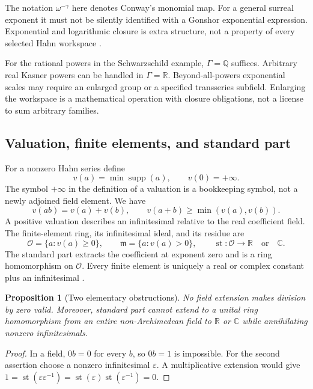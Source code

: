 \documentclass[11pt,a4paper]{article}
\numberwithin{equation}{section}
\newtheorem{proposition}[theorem]{Proposition}
\theoremstyle{definition}
\theoremstyle{remark}
\newcommand{\R}{\mathbb R}
\newcommand{\C}{\mathbb C}
\newcommand{\Q}{\mathbb Q}
\newcommand{\OO}{\mathcal O}
\newcommand{\mm}{\mathfrak m}
\newcommand{\eps}{\varepsilon}
\DeclareMathOperator{\st}{st}
\DeclareMathOperator{\supp}{supp}
\begin{document}
The notation $\omega^{-\gamma}$ here denotes Conway's monomial map. For a general surreal exponent it must not be silently identified with a Gonshor exponential expression. Exponential and logarithmic closure is extra structure, not a property of every selected Hahn workspace \cite{RepoAnalysis,vdDE,EK}.

For the rational powers in the Schwarzschild example, $\Gamma=\Q$ suffices. Arbitrary real Kasner powers can be handled in $\Gamma=\R$. Beyond-all-powers exponential scales may require an enlarged group or a specified transseries subfield. Enlarging the workspace is a mathematical operation with closure obligations, not a license to sum arbitrary families.

\subsection{Valuation, finite elements, and standard part}
For a nonzero Hahn series define
\begin{equation}
 v(a)=\min\supp(a),\qquad v(0)=+\infty.
\end{equation}
The symbol $+\infty$ in the definition of a valuation is a bookkeeping symbol, not a newly adjoined field element. We have
\begin{equation}
 v(ab)=v(a)+v(b),\qquad v(a+b)\geq\min(v(a),v(b)).
\end{equation}
A positive valuation describes an infinitesimal relative to the real coefficient field. The finite-element ring, its infinitesimal ideal, and its residue are
\begin{equation}\label{eq:standardpart}
 \OO=\{a:v(a)\geq0\},\qquad
 \mm=\{a:v(a)>0\},\qquad
 \st:\OO\longrightarrow\R\quad\text{or}\quad\C.
\end{equation}
The standard part extracts the coefficient at exponent zero and is a ring homomorphism on $\OO$. Every finite element is uniquely a real or complex constant plus an infinitesimal \cite{RepoAnalysis}.

\begin{proposition}[Two elementary obstructions]\label{prop:elementary}
No field extension makes division by zero valid. Moreover, standard part cannot extend to a unital ring homomorphism from an entire non-Archimedean field to $\R$ or $\C$ while annihilating nonzero infinitesimals.
\end{proposition}
\begin{proof}
In a field, $0b=0$ for every $b$, so $0b=1$ is impossible. For the second assertion choose a nonzero infinitesimal $\eps$. A multiplicative extension would give
$1=\st(\eps\eps^{-1})=\st(\eps)\st(\eps^{-1})=0$.
\end{proof}
\end{document}
